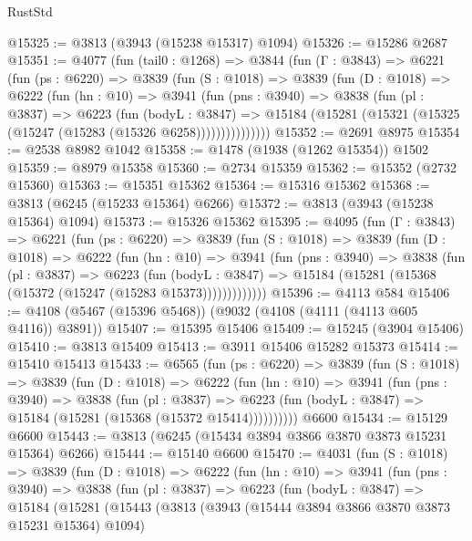 \begin{lexlean}{RustStd}
\begin{coremodule}
{\begin{coremodule}
{{{{{{{{{{{{{{{{{{{{{{{{{{{{{{{{{{{@15325 := @3813 (@3943 (@15238 @15317) @1094)
@15326 := @15286 @2687
@15351 := @4077
    (fun (tail0 : @1268) =>
    @3844
      (fun (Γ : @3843) =>
      @6221
        (fun (ps : @6220) =>
        @3839
          (fun (S : @1018) =>
          @3839
            (fun (D : @1018) =>
            @6222
              (fun (hn : @10) =>
              @3941
                (fun (pns : @3940) =>
                @3838
                  (fun (pl : @3837) =>
                  @6223
                    (fun (bodyL : @3847) =>
                    @15184 (@15281 (@15321 (@15325 (@15247 (@15283 (@15326 @6258)))))))))))))))
@15352 := @2691 @8975
@15354 := @2538 @8982 @1042
@15358 := @1478 (@1938 (@1262 @15354)) @1502
@15359 := @8979 @15358
@15360 := @2734 @15359
@15362 := @15352 (@2732 @15360)
@15363 := @15351 @15362
@15364 := @15316 @15362
@15368 := @3813 (@6245 (@15233 @15364) @6266)
@15372 := @3813 (@3943 (@15238 @15364) @1094)
@15373 := @15326 @15362
@15395 := @4095
    (fun (Γ : @3843) =>
    @6221
      (fun (ps : @6220) =>
      @3839
        (fun (S : @1018) =>
        @3839
          (fun (D : @1018) =>
          @6222
            (fun (hn : @10) =>
            @3941
              (fun (pns : @3940) =>
              @3838
                (fun (pl : @3837) =>
                @6223
                  (fun (bodyL : @3847) =>
                  @15184 (@15281 (@15368 (@15372 (@15247 (@15283 @15373)))))))))))))
@15396 := @4113 @584
@15406 := @4108 (@5467 (@15396 @5468)) (@9032 (@4108 (@4111 (@4113 @605 @4116)) @3891))
@15407 := @15395 @15406
@15409 := @15245 (@3904 @15406)
@15410 := @3813 @15409
@15413 := @3911 @15406 @15282 @15373
@15414 := @15410 @15413
@15433 := @6565
    (fun (ps : @6220) =>
    @3839
      (fun (S : @1018) =>
      @3839
        (fun (D : @1018) =>
        @6222
          (fun (hn : @10) =>
          @3941
            (fun (pns : @3940) =>
            @3838
              (fun (pl : @3837) =>
              @6223 (fun (bodyL : @3847) => @15184 (@15281 (@15368 (@15372 @15414))))))))))
    @6600
@15434 := @15129 @6600
@15443 := @3813 (@6245 (@15434 @3894 @3866 @3870 @3873 @15231 @15364) @6266)
@15444 := @15140 @6600
@15470 := @4031
    (fun (S : @1018) =>
    @3839
      (fun (D : @1018) =>
      @6222
        (fun (hn : @10) =>
        @3941
          (fun (pns : @3940) =>
          @3838
            (fun (pl : @3837) =>
            @6223
              (fun (bodyL : @3847) =>
              @15184
                (@15281
                  (@15443
                    (@3813
                      (@3943 (@15444 @3894 @3866 @3870 @3873 @15231 @15364) @1094)
}}}}}}}}}}}}}}}}}}}}}}}}}}}}}}}}}}}
\end{coremodule}}
\end{coremodule}
\end{lexlean}
